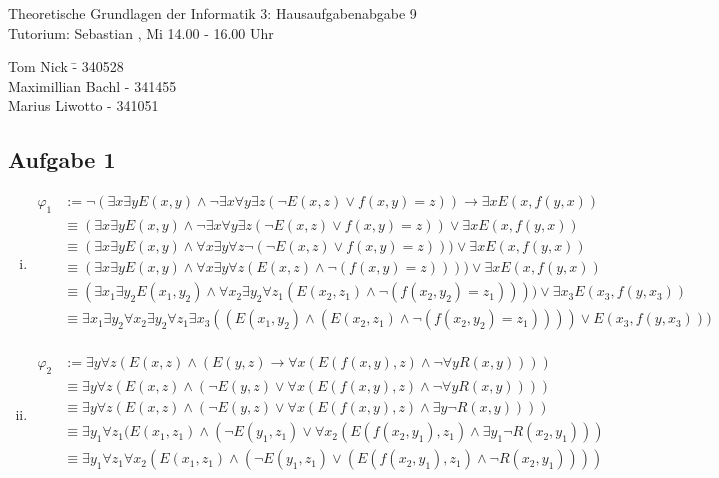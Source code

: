 \documentclass[a4paper,10pt]{article}
\begin{document}
\begin{center}
\Large{Theoretische Grundlagen der Informatik 3: Hausaufgabenabgabe 9} \\
\large{Tutorium: Sebastian , Mi 14.00 - 16.00 Uhr}
\end{center}
\begin{tabbing}
Tom Nick \hspace{2cm}\= - 340528\\
Maximillian Bachl \> - 341455 \\
Marius Liwotto\> -  341051
\end{tabbing}
\subsection*{Aufgabe 1}
\begin{enumerate}[(i)]
	\item 
		\begin{align*}
			\varphi_1 &:= \lnot (\exists x \exists y E(x,y) \land \lnot \exists x \forall y \exists z (\lnot E(x,z) \lor f(x,y) = z)) \rightarrow \exists x E(x,f(y,x)) \\
			&\equiv  (\exists x \exists y E(x,y) \land \lnot \exists x \forall y \exists z (\lnot E(x,z) \lor f(x,y) = z)) \lor \exists x E(x,f(y,x)) \\
			&\equiv  (\exists x \exists y E(x,y) \land \forall x \exists y \forall z \lnot(\lnot E(x,z) \lor f(x,y) = z))) \lor \exists x E(x,f(y,x)) \\
			&\equiv  (\exists x \exists y E(x,y) \land \forall x \exists y \forall z (E(x,z) \land \lnot(f(x,y) = z)))) \lor \exists x E(x,f(y,x)) \\
			&\equiv  (\exists x_1 \exists y_2 E(x_1,y_2) \land \forall x_2 \exists y_2 \forall z_1 (E(x_2,z_1) \land \lnot(f(x_2,y_2) = z_1)))) \lor \exists x_3 E(x_3,f(y,x_3)) \\
			&\equiv  \exists x_1 \exists y_2\forall x_2 \exists y_2 \forall z_1\exists x_3((E(x_1,y_2) \land   (E(x_2,z_1) \land \lnot(f(x_2,y_2) = z_1)))) \lor E(x_3,f(y,x_3)))  \\
		\end{align*}
	\item 
		\begin{align*}
			\varphi_2 &:= \exists y \forall z (E(x,z) \land (E(y,z) \rightarrow \forall x(E(f(x,y),z)\land \lnot \forall  y R(x,y) ))) \\
			&\equiv \exists y \forall z (E(x,z) \land (\lnot E(y,z) \lor\forall x(E(f(x,y),z)\land \lnot \forall  y R(x,y) ))) \\
			&\equiv \exists y \forall z (E(x,z) \land (\lnot E(y,z) \lor\forall x(E(f(x,y),z)\land \exists y \lnot R(x,y) ))) \\
			&\equiv \exists y_1 \forall z_1 (E(x_1,z_1) \land (\lnot E(y_1,z_1) \lor \forall x_2 (E(f(x_2,y_1),z_1)\land \exists y_1 \lnot R(x_2,y_1) )) \\
			&\equiv \exists y_1 \forall z_1 \forall x_2 (E(x_1,z_1) \land (\lnot E(y_1,z_1) \lor  (E(f(x_2,y_1),z_1)\land \lnot R(x_2,y_1) ))) \\
		\end{align*}
\end{enumerate}
\end{document}

